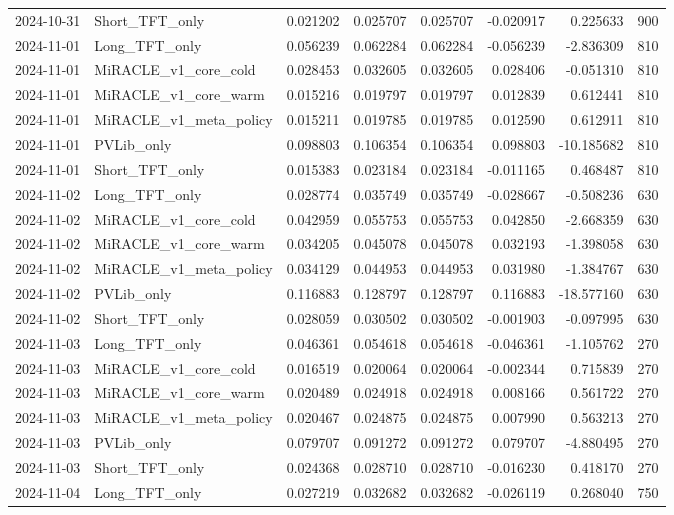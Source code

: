 \begin{tabular}{llrrrrrr}
2024-10-31 & Short_TFT_only & 0.021202 & 0.025707 & 0.025707 & -0.020917 & 0.225633 & 900 \\
2024-11-01 & Long_TFT_only & 0.056239 & 0.062284 & 0.062284 & -0.056239 & -2.836309 & 810 \\
2024-11-01 & MiRACLE_v1_core_cold & 0.028453 & 0.032605 & 0.032605 & 0.028406 & -0.051310 & 810 \\
2024-11-01 & MiRACLE_v1_core_warm & 0.015216 & 0.019797 & 0.019797 & 0.012839 & 0.612441 & 810 \\
2024-11-01 & MiRACLE_v1_meta_policy & 0.015211 & 0.019785 & 0.019785 & 0.012590 & 0.612911 & 810 \\
2024-11-01 & PVLib_only & 0.098803 & 0.106354 & 0.106354 & 0.098803 & -10.185682 & 810 \\
2024-11-01 & Short_TFT_only & 0.015383 & 0.023184 & 0.023184 & -0.011165 & 0.468487 & 810 \\
2024-11-02 & Long_TFT_only & 0.028774 & 0.035749 & 0.035749 & -0.028667 & -0.508236 & 630 \\
2024-11-02 & MiRACLE_v1_core_cold & 0.042959 & 0.055753 & 0.055753 & 0.042850 & -2.668359 & 630 \\
2024-11-02 & MiRACLE_v1_core_warm & 0.034205 & 0.045078 & 0.045078 & 0.032193 & -1.398058 & 630 \\
2024-11-02 & MiRACLE_v1_meta_policy & 0.034129 & 0.044953 & 0.044953 & 0.031980 & -1.384767 & 630 \\
2024-11-02 & PVLib_only & 0.116883 & 0.128797 & 0.128797 & 0.116883 & -18.577160 & 630 \\
2024-11-02 & Short_TFT_only & 0.028059 & 0.030502 & 0.030502 & -0.001903 & -0.097995 & 630 \\
2024-11-03 & Long_TFT_only & 0.046361 & 0.054618 & 0.054618 & -0.046361 & -1.105762 & 270 \\
2024-11-03 & MiRACLE_v1_core_cold & 0.016519 & 0.020064 & 0.020064 & -0.002344 & 0.715839 & 270 \\
2024-11-03 & MiRACLE_v1_core_warm & 0.020489 & 0.024918 & 0.024918 & 0.008166 & 0.561722 & 270 \\
2024-11-03 & MiRACLE_v1_meta_policy & 0.020467 & 0.024875 & 0.024875 & 0.007990 & 0.563213 & 270 \\
2024-11-03 & PVLib_only & 0.079707 & 0.091272 & 0.091272 & 0.079707 & -4.880495 & 270 \\
2024-11-03 & Short_TFT_only & 0.024368 & 0.028710 & 0.028710 & -0.016230 & 0.418170 & 270 \\
2024-11-04 & Long_TFT_only & 0.027219 & 0.032682 & 0.032682 & -0.026119 & 0.268040 & 750 \\

\end{tabular}
